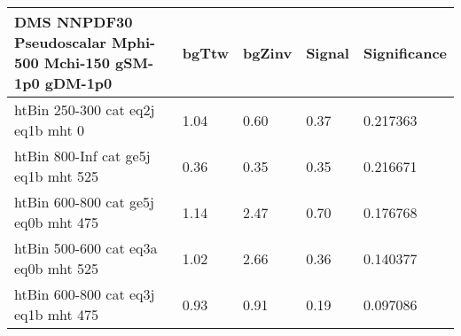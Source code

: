 \begin{tabular}{|l|l|l|l|l|}
\footnotesize
  \label{mostSensitiveBins_DMS_NNPDF30_Pseudoscalar_Mphi-500_Mchi-150_gSM-1p0_gDM-1p0_25ns}
	\textbf{DMS NNPDF30 Pseudoscalar Mphi-500 Mchi-150 gSM-1p0 gDM-1p0}	 & 	bgTtw	 & 	bgZinv	 & 	Signal &	 Significance \\ 
	\hline
	htBin 250-300 cat eq2j eq1b mht 0 & 	1.04	 & 	0.60	 & 	0.37 	&0.217363 \\ 
	htBin 800-Inf cat ge5j eq1b mht 525 & 	0.36	 & 	0.35	 & 	0.35 	&0.216671 \\ 
	htBin 600-800 cat ge5j eq0b mht 475 & 	1.14	 & 	2.47	 & 	0.70 	&0.176768 \\ 
	htBin 500-600 cat eq3a eq0b mht 525 & 	1.02	 & 	2.66	 & 	0.36 	&0.140377 \\ 
	htBin 600-800 cat eq3j eq1b mht 475 & 	0.93	 & 	0.91	 & 	0.19 	&0.097086 \\ 
\end{tabular}
